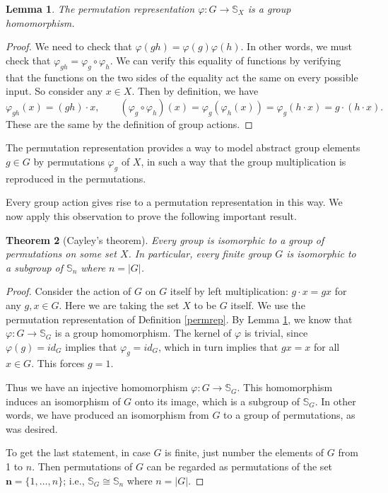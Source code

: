 \documentclass[11pt,oneside]{article}
\newtheorem{thm}{Theorem}[section]
\newtheorem{lem}[thm]{Lemma}
\theoremstyle{definition}
\newcommand{\Sym}{\mathbb{S}}
\begin{document}
\begin{lem}\label{lem:perm-rep-is-a-homo}
  The permutation representation $\varphi \colon G \to \Sym_X$ is a
  group homomorphism.
\end{lem}

\begin{proof}
We need to check that $\varphi(gh) = \varphi(g) \varphi(h)$. In other
words, we must check that $\varphi_{gh} = \varphi_g \circ
\varphi_h$. We can verify this equality of functions by verifying that
the functions on the two sides of the equality act the same on every
possible input. So consider any $x \in X$. Then by definition, we have
\[
  \varphi_{gh}(x) = (gh) \cdot x, \qquad (\varphi_g \circ
  \varphi_h)(x) = \varphi_g(\varphi_h(x)) = \varphi_g(h \cdot x) = g
  \cdot(h \cdot x).
\]
These are the same by the definition of group actions.
\end{proof}

The permutation representation provides a way to model abstract group
elements $g \in G$ by permutations $\varphi_g$ of $X$, in such a way
that the group multiplication is reproduced in the permutations.

Every group action gives rise to a permutation representation in this
way. We now apply this observation to prove the following important
result.


\begin{thm}[Cayley's theorem] 
Every group is isomorphic to a group of permutations on some set $X$.
In particular, every finite group $G$ is isomorphic to a subgroup of
$\Sym_n$ where $n = |G|$.
\end{thm}

\begin{proof}
Consider the action of $G$ on $G$ itself by left multiplication:
$g\cdot x = gx$ for any $g,x \in G$. Here we are taking the set $X$ to
be $G$ itself.  We use the permutation representation of Definition
\ref{permrep}.  By Lemma \ref{lem:perm-rep-is-a-homo}, we know that
$\varphi: G \to \Sym_G$ is a group homomorphism. The kernel of
$\varphi$ is trivial, since $\varphi(g) = id_G$ implies that
$\varphi_g = id_G$, which in turn implies that $gx=x$ for all $x \in
G$. This forces $g=1$.

Thus we have an injective homomorphism $\varphi: G \to \Sym_G$. This
homomorphism induces an isomorphism of $G$ onto its image, which is a
subgroup of $\Sym_G$. In other words, we have produced an isomorphism
from $G$ to a group of permutations, as was desired.

To get the last statement, in case $G$ is finite, just number the
elements of $G$ from 1 to $n$. Then permutations of $G$ can be
regarded as permutations of the set $\mathbf{n} = \{1, \dots, n\}$;
i.e., $\Sym_G \cong \Sym_n$ where $n =|G|$.
\end{proof}
\end{document}
